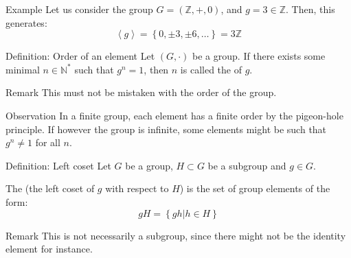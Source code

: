 \documentclass[a4paper]{article}
\begin{document}
\begin{parag}{Example}
    Let us consider the group $G = \left(\mathbb{Z}, +, 0\right)$, and $g = 3 \in \mathbb{Z}$. Then, this generates: 
    \[\left\langle g \right\rangle = \left\{0, \pm 3, \pm 6, \ldots\right\} = 3 \mathbb{Z}\]
\end{parag}

\begin{parag}{Definition: Order of an element}
    Let $\left(G, \cdot \right)$ be a group. If there exists some minimal $n \in \mathbb{N}^*$ such that $g^n = 1$, then $n$ is called the  of $g$.

    \begin{subparag}{Remark}
        This must not be mistaken with the order of the group.
    \end{subparag}

    \begin{subparag}{Observation}
        In a finite group, each element has a finite order by the pigeon-hole principle. If however the group is infinite, some elements might be such that $g^n \neq 1$ for all $n$.
    \end{subparag}
\end{parag}

\begin{parag}{Definition: Left coset}
    Let $G$ be a group, $H \subset G$ be a subgroup and $g \in G$. 

    The  (the left coset of $g$ with respect to $H$) is the set of group elements of the form: 
    \[gH = \left\{gh | h \in H\right\}\]
    
    \begin{subparag}{Remark}
        This is not necessarily a subgroup, since there might not be the identity element for instance.
    \end{subparag}
\end{parag}
\end{document}
